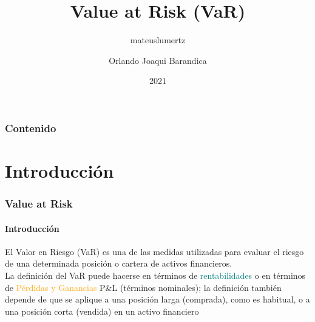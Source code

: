 \documentclass[aspectratio=169]{beamer}
\author{mateuslumertz}
\title[Maestría en Analítica e Inteligencia de Negocios]{Value at Risk (VaR)}
\author{Orlando Joaqui Barandica}
\institute{Maestría en Analítica e Inteligencia de Negocios}
\date{2021}
\begin{document}
\begin{frame}[plain]
\maketitle
\end{frame}



\begin{frame}
  \frametitle{Contenido}
  \tableofcontents[hidesubsections]
\end{frame}



\section{Introducción}
\begin{frame}
\frametitle{Value at Risk}
\framesubtitle{Introducción}


El Valor en Riesgo (VaR) es una de las medidas utilizadas para evaluar el riesgo de una determinada posición o cartera de activos financieros.\\

\vspace{4mm}
La definición del VaR puede hacerse en términos de \textcolor{teal}{rentabilidades} o en términos de \textcolor{orange}{Pérdidas y Ganancias} P\&L (términos nominales); la definición también depende de que se aplique a una posición larga (comprada), como es habitual, o a una posición corta (vendida) en un activo financiero


\end{frame}



\end{document}
